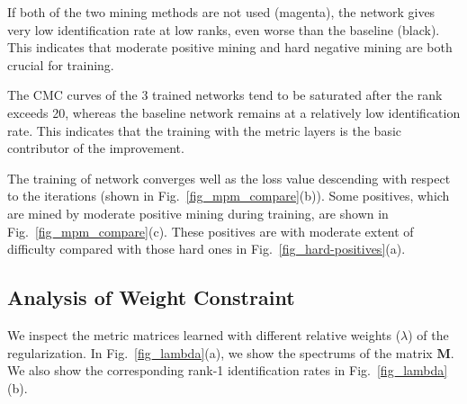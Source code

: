 \documentclass[runningheads]{llncs}
\begin{document}
If both of the two mining methods are not used (magenta), the network gives very low identification rate at low ranks, even worse than the baseline (black).
This indicates that moderate positive mining and hard negative mining are both crucial for training.

The CMC curves of the 3 trained networks tend to be saturated after the rank exceeds 20, whereas the baseline network remains at a relatively low identification rate.
This indicates that the training with the metric layers is the basic contributor of the improvement.

The training of network converges well as the loss value descending with respect to the iterations (shown in Fig.~\ref{fig_mpm_compare}(b)). Some positives, which are mined by moderate positive mining during training, are shown in Fig.~\ref{fig_mpm_compare}(c). These positives are with moderate extent of difficulty compared with those hard ones in Fig.~\ref{fig_hard-positives}(a).



\begin{figure*}[!h]
  \centering
  \hspace{2pt}
  \caption{(a) Performance analysis of moderate positive mining.
  Red: both moderate positive mining and hard negative mining are employed.
  Blue: only hard negative mining is employed.
  Magenta: no mining technique is employed during training.
  Black: the softmax baseline.
  (b) The loss curves along training iterations. Black: training set. Red: validation set.
  (c) Some positives mined by the moderate positive mining method.}

  \label{fig_mpm_compare}
\end{figure*}



\subsection{Analysis of Weight Constraint}
\label{section_Analysis of Weight Constraint}

We inspect the metric matrices learned with different relative weights ($\lambda$) of the regularization.
In Fig.~\ref{fig_lambda}(a), we show the spectrums of the matrix $\textbf{M}$.
We also show the corresponding rank-1 identification rates in Fig.~\ref{fig_lambda}(b).
\end{document}
